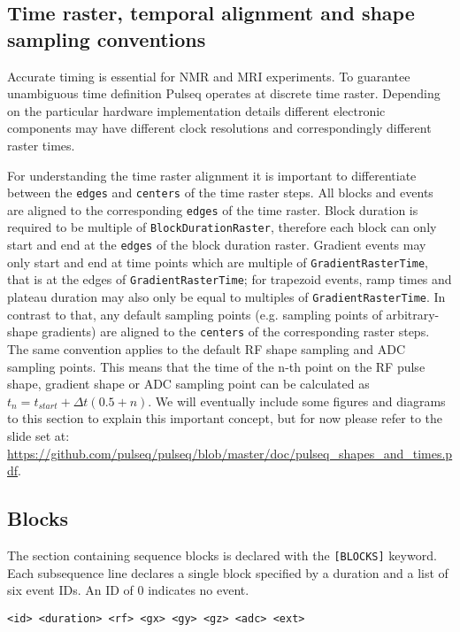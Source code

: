 \documentclass{article}
\begin{document}
\subsection{Time raster, temporal alignment and shape sampling conventions}\label{subsec:timing}

Accurate timing is essential for NMR and MRI experiments. To guarantee 	
unambiguous time definition Pulseq operates at discrete time raster. Depending on the particular hardware implementation details different electronic components may have different clock resolutions and correspondingly different raster times. 

For understanding the time raster alignment it is important to differentiate between the \verb.edges. and \verb.centers. of the time raster steps. All blocks and events are aligned to the corresponding \verb.edges. of the time raster. Block duration is required to be multiple of \verb.BlockDurationRaster., therefore each block can only start and end at the \verb.edges. of the block duration raster. Gradient events may only start and end at time points which are multiple of \verb.GradientRasterTime., that is at the edges of \verb.GradientRasterTime.; for trapezoid events, ramp times and plateau duration may also only be equal to multiples of \verb.GradientRasterTime.. In contrast to that, any default sampling points (e.g. sampling points of arbitrary-shape gradients) are aligned to the \verb.centers. of the corresponding raster steps. The same convention applies to the default RF shape sampling and ADC sampling points. This means that the time of the n-th point on the RF pulse shape, gradient shape or ADC sampling point can be calculated as $t_n=t_{start} + \Delta t(0.5+n)$. We will eventually include some figures and diagrams to this section to explain this important concept, but for now please refer to the slide set at: \href{https://github.com/pulseq/pulseq/blob/master/doc/pulseq_shapes_and_times.pdf}{https://github.com/pulseq/pulseq/blob/master/doc/pulseq\_shapes\_and\_times.pdf}.


\subsection{Blocks}

The section containing sequence blocks is declared with the \verb.[BLOCKS]. keyword. Each subsequence line declares a single block specified by a duration and a list of six event IDs. An ID of 0 indicates no event.
\begin{lstlisting}
<id> <duration> <rf> <gx> <gy> <gz> <adc> <ext>
\end{lstlisting}
\end{document}
